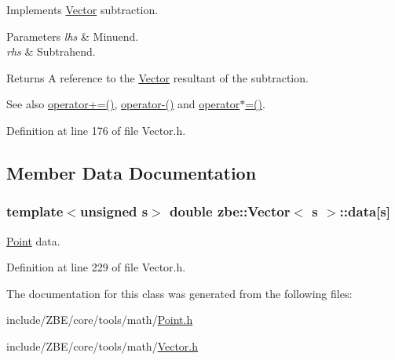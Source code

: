 Implements \hyperlink{classzbe_1_1_vector}{Vector} subtraction. 


\begin{DoxyParams}{Parameters}
{\em lhs} & Minuend. \\
\hline
{\em rhs} & Subtrahend. \\
\hline
\end{DoxyParams}
\begin{DoxyReturn}{Returns}
A reference to the \hyperlink{classzbe_1_1_vector}{Vector} resultant of the subtraction. 
\end{DoxyReturn}
\begin{DoxySeeAlso}{See also}
\hyperlink{classzbe_1_1_vector_ae506e73798e78b596dd43be34bfbdd73}{operator+=()}, \hyperlink{classzbe_1_1_vector_a215c195ff041f6e8230c5ce619174651}{operator-\/()} and \hyperlink{classzbe_1_1_vector_a7088f4ab907e75ce8ba529189917c5ca}{operator$\ast$=()}. 
\end{DoxySeeAlso}


Definition at line 176 of file Vector.\+h.



\subsection{Member Data Documentation}
\hypertarget{classzbe_1_1_vector_a1adaf8d4244fe2c1d762d6c58f4b01eb}{}
\subsubsection[{data}]{\setlength{\rightskip}{0pt plus 5cm}template$<$unsigned s$>$ double {\bf zbe\+::\+Vector}$<$ s $>$\+::data\mbox{[}s\mbox{]}\hspace{0.3cm}{\ttfamily [protected]}}\label{classzbe_1_1_vector_a1adaf8d4244fe2c1d762d6c58f4b01eb}


\hyperlink{classzbe_1_1_point}{Point} data. 



Definition at line 229 of file Vector.\+h.



The documentation for this class was generated from the following files\+:\begin{DoxyCompactItemize}
\item 
include/\+Z\+B\+E/core/tools/math/\hyperlink{_point_8h}{Point.\+h}\item 
include/\+Z\+B\+E/core/tools/math/\hyperlink{_vector_8h}{Vector.\+h}\end{DoxyCompactItemize}

